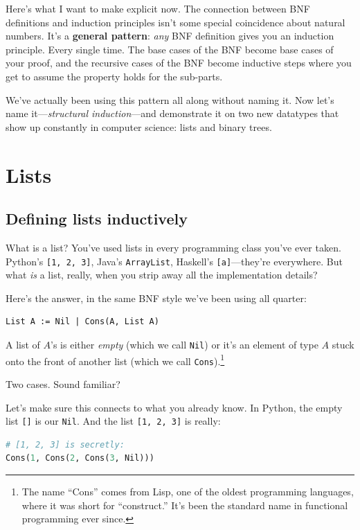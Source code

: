 \documentclass[11pt]{article}
\begin{document}
Here's what I want to make explicit now. The connection between BNF definitions and induction principles isn't some special coincidence about natural numbers. It's a \textbf{general pattern}: \emph{any} BNF definition gives you an induction principle. Every single time. The base cases of the BNF become base cases of your proof, and the recursive cases of the BNF become inductive steps where you get to assume the property holds for the sub-parts.

We've actually been using this pattern all along without naming it. Now let's name it---\emph{structural induction}---and demonstrate it on two new datatypes that show up constantly in computer science: lists and binary trees.

\section{Lists}

\subsection{Defining lists inductively}
What is a list? You've used lists in every programming class you've ever taken. Python's \texttt{[1, 2, 3]}, Java's \texttt{ArrayList}, Haskell's \texttt{[a]}---they're everywhere. But what \emph{is} a list, really, when you strip away all the implementation details?

Here's the answer, in the same BNF style we've been using all quarter:

\begin{definition}[List]
\begin{lstlisting}
List A := Nil | Cons(A, List A)
\end{lstlisting}
A list of $A$'s is either \emph{empty} (which we call \texttt{Nil}) or it's an element of type $A$ stuck onto the front of another list (which we call \texttt{Cons}).\footnote{The name ``Cons'' comes from Lisp, one of the oldest programming languages, where it was short for ``construct.'' It's been the standard name in functional programming ever since.}
\end{definition}

\noindent Two cases. Sound familiar?

Let's make sure this connects to what you already know. In Python, the empty list \texttt{[]} is our \texttt{Nil}. And the list \texttt{[1, 2, 3]} is really:
\begin{lstlisting}[language=Python]
# [1, 2, 3] is secretly:
Cons(1, Cons(2, Cons(3, Nil)))
\end{lstlisting}
\end{document}
